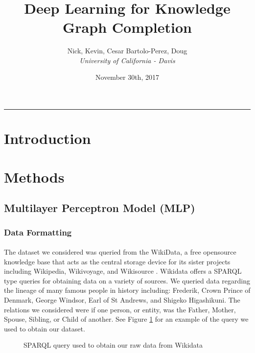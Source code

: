 \documentclass[11.5pt]{article}
\newcounter{Figure}
\begin{document}
\title{Deep Learning for Knowledge Graph Completion}
\author{Nick, Kevin, Cesar Bartolo-Perez, Doug\\
	{\small\textit{University of California - Davis}}
} 
\date{November 30th, 2017}
\maketitle
\rule{\textwidth}{1pt}



\begin{abstract}

\end{abstract}

\tableofcontents


\section{Introduction}



\section{Methods}
\subsection*{Multilayer Perceptron Model (MLP)}
\subsubsection{Data Formatting}


\paragraph{} The dataset we considered was queried from the WikiData, a free opensource knowledge base that acts as the central storage device for its sister projects including Wikipedia, Wikivoyage, and Wikisource \cite{Wikidata}. Wikidata offers a SPARQL type queries for obtaining data on a variety of sources. We queried data regarding the lineage of many famous people in history including: Frederik, Crown Prince of Denmark, George Windsor, Earl of St Andrews, and Shigeko Higashikuni. The relations we considered were if one person, or entity, was the Father, Mother, Spouse, Sibling, or Child of another. See Figure \ref{query} for an example of the query we used to obtain our dataset. 


\begin{figure}[h!]
 
 \caption{SPARQL query used to obtain our raw data from Wikidata}
 \label{query}
\end{figure}
\end{document}
